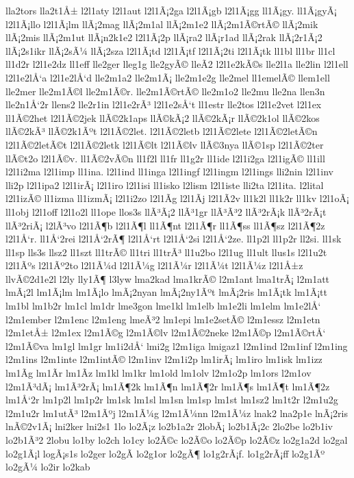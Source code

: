 {lla2tors
lla2t1Å±
l2l1aty
l2l1aut
l2l1Ã¡2ga
l2l1Ã¡gb
l2l1Ã¡gg
ll1Ã¡gy.
ll1Ã¡gyÃ¡
l2l1Ã¡llo
l2l1Ã¡lm
llÃ¡2mag
llÃ¡2m1al
llÃ¡2m1e2
llÃ¡2m1Ã©rtÃ©
llÃ¡2mik
llÃ¡2mis
llÃ¡2m1ut
llÃ¡n2k1e2
l2l1Ã¡2p
llÃ¡ra2
llÃ¡r1ad
llÃ¡2rak
llÃ¡2r1Ã¡2
llÃ¡2s1ikr
llÃ¡2sÃ¼
llÃ¡2sza
l2l1Ã¡td
l2l1Ã¡tf
l2l1Ã¡2ti
l2l1Ã¡tk
ll1bl
ll1br
ll1cl
ll1d2r
l2l1e2dz
ll1eff
lle2ger
lleg1g
lle2gyÃ©
lleÃ­2
l2l1e2kÃ©s
lle2l1a
lle2lin
l2l1ell
l2l1e2lÅ‘a
l2l1e2lÅ‘d
lle2m1a2
lle2m1Ã¡
lle2m1e2g
lle2mel
ll1emelÃ©
llem1ell
lle2mer
lle2m1Ã©l
lle2m1Ã©r.
lle2m1Ã©rtÃ©
lle2m1o2
lle2mu
lle2na
llen3n
lle2n1Å‘2r
llens2
lle2r1in
l2l1e2rÃ³
l2l1e2sÅ‘t
ll1estr
lle2tos
l2l1e2vet
l2l1ex
ll1Ã©2het
l2l1Ã©2jek
llÃ©2k1aps
llÃ©kÃ¡2
llÃ©2kÃ¡r
llÃ©2k1ol
llÃ©2kos
llÃ©2kÃ³
llÃ©2k1Ãºt
l2l1Ã©2let.
l2l1Ã©2letb
l2l1Ã©2lete
l2l1Ã©2letÃ©n
l2l1Ã©2letÃ©t
l2l1Ã©2letk
l2l1Ã©lt
l2l1Ã©lv
llÃ©3nya
llÃ©1sp
l2l1Ã©2ter
llÃ©t2o
l2l1Ã©v.
ll1Ã©2vÃ©n
ll1f2l
ll1fr
ll1g2r
ll1ide
l2l1i2ga
l2l1igÃ©
ll1ill
l2l1i2ma
l2l1imp
ll1ina.
l2l1ind
ll1inga
l2l1ingf
l2l1ingm
l2l1ings
lli2nin
l2l1inv
lli2p
l2l1ipa2
l2l1irÃ¡
l2l1iro
l2l1isi
ll1isko
l2lism
l2l1iste
lli2ta
l2l1ita.
l2lital
l2l1izÃ©
ll1izma
ll1izmÃ¡
l2l1i2zo
l2l1Ã­g
l2l1Ã­j
l2l1Ã­2v
ll1k2l
ll1k2r
ll1kv
l2l1oÃ¡
ll1obj
l2l1off
l2l1o2l
ll1ope
llos3s
llÃ³Ã¡2
llÃ³1gr
llÃ³Ã³2
llÃ³2rÃ¡k
llÃ³2rÃ¡t
llÃ³2riÃ¡
l2lÃ³vo
l2l1Ã¶b
l2l1Ã¶l
ll1Ã¶nt
l2l1Ã¶r
ll1Ã¶ss
ll1Ã¶sz
l2l1Ã¶2z
l2l1Å‘r.
ll1Å‘2rei
l2l1Å‘2rÃ¶
l2l1Å‘rt
l2l1Å‘2si
l2l1Å‘2ze.
ll1p2l
ll1p2r
ll2si.
ll1sk
ll1sp
lls3s
llsz2
ll1szt
ll1trÃ©
ll1tri
ll1trÃ³
ll1u2bo
l2l1ug
ll1ult
llus1s
l2l1u2t
l2l1Ãºs
l2l1Ãº2to
l2l1Ã¼d
l2l1Ã¼g
l2l1Ã¼r
l2l1Ã¼t
l2l1Ã¼z
l2l1Å±z
llvÃ©2d1e2l
l2ly
lly1Ã¶
l3lyw
lma2kad
lma1krÃ©
l2m1ant
lma1trÃ¡
l2m1att
lmÃ¡2l
lm1Ã¡lm
lm1Ã¡lo
lmÃ¡2nyan
lmÃ¡2ny1Ãºt
lmÃ¡2ris
lm1Ã¡tk
lm1Ã¡tt
lm1bl
lm1b2r
lm1cl
lm1dr
lme3gon
lme1kl
lm1elb
lm1e2li
lm1elm
lm1e2lÅ‘
l2m1ember
l2m1enc
l2m1eng
lmeÃ³2
lm1epi
lm1e2setÃ©
l2m1essz
l2m1etn
l2m1etÅ±
l2m1ex
l2m1Ã©g
l2m1Ã©lv
l2m1Ã©2neke
l2m1Ã©p
l2m1Ã©rtÅ‘
l2m1Ã©va
lm1gl
lm1gr
lm1i2dÅ‘
lmi2g
l2m1iga
lmigaz1
l2m1ind
l2m1inf
l2m1ing
l2m1ins
l2m1inte
l2m1intÃ©
l2m1inv
l2m1i2p
lm1irÃ¡
lm1iro
lm1isk
lm1izz
lm1Ã­g
lm1Ã­r
lm1Ã­z
lm1kl
lm1kr
lm1old
lm1olv
l2m1o2p
lm1ors
l2m1ov
l2m1Ã³dÃ¡
lm1Ã³2rÃ¡
lm1Ã¶2k
lm1Ã¶n
lm1Ã¶2r
lm1Ã¶s
lm1Ã¶t
lm1Ã¶2z
lm1Å‘2r
lm1p2l
lm1p2r
lm1sk
lm1sl
lm1sn
lm1sp
lm1st
lm1sz2
lm1t2r
l2m1u2g
l2m1u2r
lm1utÃ³
l2m1Ãºj
l2m1Ã¼g
l2m1Ã¼nn
l2m1Ã¼z
lnak2
lna2p1e
lnÃ¡2ris
lnÃ©2v1Ã¡
lni2ker
lni2s1
1lo
lo2Ã¡z
lo2b1a2r
2lobÃ¡
lo2b1Ã¡2c
2lo2be
lo2b1iv
lo2b1Ã³2
2lobu
lo1by
lo2ch
lo1cy
lo2Ã©c
lo2Ã©o
lo2Ã©p
lo2Ã©z
lo2g1a2d
lo2gal
lo2g1Ã¡l
logÃ¡s1s
lo2ger
lo2gÃ­
lo2g1or
lo2gÃ¶
lo1g2rÃ¡f.
lo1g2rÃ¡ff
lo2g1Ãº
lo2gÃ¼
lo2ir
lo2kab
}
